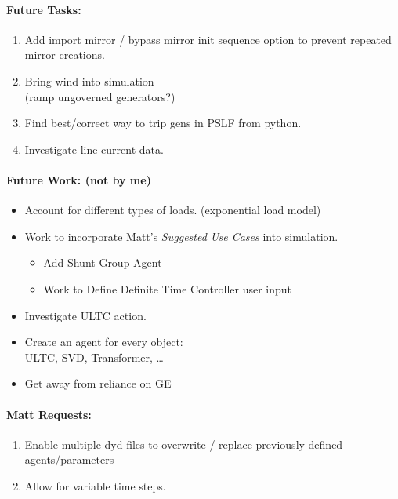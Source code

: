 \documentclass[12pt]{article}
\begin{document}
\begin{multicols}{2}
\vfill\null
\columnbreak



\paragraph{Future Tasks:} %
	\begin{enumerate}
		
		\item Add import mirror / bypass mirror init sequence option to prevent repeated mirror creations.

		\item Bring wind into simulation \\ (ramp ungoverned generators?)

		\item Find best/correct way to trip gens in PSLF from python.

		\item Investigate line current data.
		
	\end{enumerate}
\paragraph{Future Work: (not by me)}
\begin{itemize}
\item Account for different types of loads. (exponential load model) %
\item Work to incorporate Matt's \emph{Suggested Use Cases} into simulation.
		\begin{itemize}
		\item Add Shunt Group Agent
		\item Work to Define Definite Time Controller user input
		\end{itemize} 


		\item Investigate ULTC action.

		\item Create an agent for every object: \\ ULTC, SVD, Transformer, \ldots

		\item Get away from reliance on GE
		
\end{itemize}

\paragraph{Matt Requests:}
\begin{enumerate}
		\item Enable multiple dyd files to overwrite / replace previously defined agents/parameters
		\item Allow for variable time steps.
\end{enumerate}

\vfill\null
\end{multicols}

		
\end{document}
